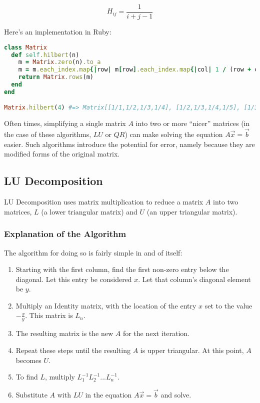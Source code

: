 \documentclass[letterpaper,12pt]{article}
\begin{document}
\[H_{ij} = \frac{1}{i + j - 1}\]

Here's an implementation in Ruby:

\lstset{caption=Hilbert Matrix Implementation}
\begin{lstlisting}[language=ruby]
class Matrix
  def self.hilbert(n)
    m = Matrix.zero(n).to_a
    m = m.each_index.map{|row| m[row].each_index.map{|col| 1 / (row + col + 1)}}
    return Matrix.rows(m)
  end
end

Matrix.hilbert(4) #=> Matrix[[1/1,1/2,1/3,1/4], [1/2,1/3,1/4,1/5], [1/3,1/4,1/5,1/6], [1/4,1/5,1/6,1/7]]
\end{lstlisting}

Often times, simplifying a single matrix $A$ into two or more ``nicer'' matrices
(in the case of these algorithms, $LU$ or $QR$) can make solving the equation
$A\vec{x}=\vec{b}$ easier.
Such algorithms introduce the potential for error, namely because they are
modified forms of the original matrix.

\subsection{LU Decomposition}

LU Decomposition uses matrix multiplication to reduce a matrix $A$ into two
matrices, $L$ (a lower triangular matrix) and $U$ (an upper triangular matrix).

\subsubsection{Explanation of the Algorithm}

The algorithm for doing so is fairly simple in and of itself:

\begin{enumerate}
\item Starting with the first column, find the first non-zero entry below the
  diagonal. Let this entry be considered $x$. Let that column's diagonal element
  be $y$.
\item Multiply an Identity matrix, with the location of the entry $x$ set to the
  value $-\frac{x}{y}$. This matrix is $L_n$.
\item The resulting matrix is the new $A$ for the next iteration.
\item Repeat these steps until the resulting $A$ is upper triangular.
  At this point, $A$ becomes $U$.
\item To find $L$, multiply $L_1^{-1}L_2^{-1} ... L_n^{-1}$.
\item Substitute $A$ with $LU$ in the equation $A\vec{x}=\vec{b}$ and solve.
\end{enumerate}
\end{document}
